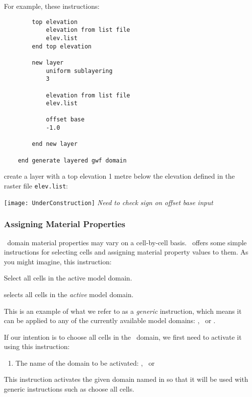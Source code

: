     For example, these instructions:
\begin{verbatim}
        top elevation
            elevation from list file
            elev.list
        end top elevation

        new layer
            uniform sublayering
            3

            elevation from list file
            elev.list

            offset base
            -1.0

        end new layer

    end generate layered gwf domain
\end{verbatim}
 create a layer with a top elevation 1 metre below the elevation defined in the raster file \texttt{elev.list}:

\texttt{[image: UnderConstruction]} \textit{Need to check sign on \textsf{offset base} input}

\subsubsection{Assigning Material Properties}  

\gwf\ domain material properties may vary on a cell-by-cell  basis.  \mut\ offers some simple instructions for selecting cells and assigning material property values to them.  As you might imagine, this instruction:

    {Select all cells in the active model domain.
     }

selects all cells in the {\em active} model domain.

This is an example of what we refer to as a {\em generic} instruction, which means it can be applied to any of the currently available model domains: \gwf, \swf\ or \cln.
\pagebreak

If our intention is to choose all cells in the \gwf\ domain, we first need to activate it using this instruction:

    {
        \squish
        \begin{enumerate}
        \item {}  The name of the domain to be activated: \gwf, \swf\ or \cln\
        \end{enumerate}
        This instruction activates the given domain named in   so that it will be used with generic instructions such as \textsf{choose all cells}.
    }

